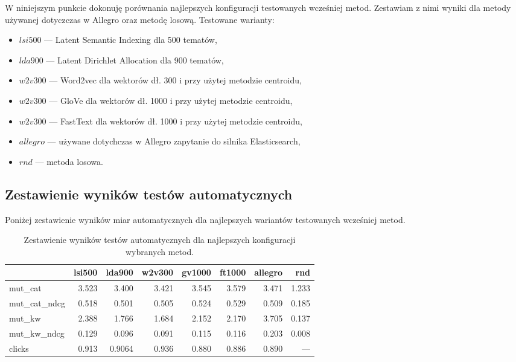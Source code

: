\documentclass[pl]{minipw} %
\begin{document}
W niniejszym punkcie dokonuję porównania najlepszych konfiguracji testowanych wcześniej metod. Zestawiam z nimi wyniki dla metody używanej dotyczczas w Allegro oraz metodę losową.
Testowane warianty:
\begin{itemize}
	\item $lsi500$ --- Latent Semantic Indexing dla 500 tematów,
	\item $lda900$ --- Latent Dirichlet Allocation dla 900 tematów,
	\item $w2v300$ --- Word2vec dla wektorów dł. 300 i przy użytej metodzie centroidu,
	\item $w2v300$ --- GloVe dla wektorów dł. 1000 i przy użytej metodzie centroidu,
	\item $w2v300$ --- FastText dla wektorów dł. 1000 i przy użytej metodzie centroidu,
	\item $allegro$ --- używane dotychczas w Allegro zapytanie do silnika Elasticsearch,
	\item $rnd$ --- metoda losowa.
\end{itemize}
\subsection{Zestawienie wyników testów automatycznych}
Poniżej zestawienie wyników miar automatycznych dla najlepszych wariantów testowanych wcześniej metod.
\begin{table}
	\centering
	\begin{tabular}{lrrrrrrr}
		\hline
		&   lsi500 &    lda900 &    w2v300 &   gv1000 &   ft1000 &   allegro &          rnd \\
		\hline
		mut\_cat      & 3.523  & 3.400   & 3.421   & 3.545  & 3.579  &  3.471  &   1.233    \\
		mut\_cat\_ndcg & 0.518 & 0.501  & 0.505  & 0.524 & 0.529 &  0.509 &   0.185    \\
		mut\_kw       & 2.388  & 1.766   & 1.684   & 2.152  & 2.170  &  3.705  &   0.137   \\
		mut\_kw\_ndcg  & 0.129 & 0.096 & 0.091 & 0.115 & 0.116 &  0.203 &   0.008 \\
		clicks       & 0.913 & 0.9064  & 0.936  & 0.880 & 0.886 &  0.890 & ---          \\
		\hline
	\end{tabular}
	\caption{Zestawienie wyników testów automatycznych dla najlepszych konfiguracji wybranych metod.}
\end{table}
\end{document}

